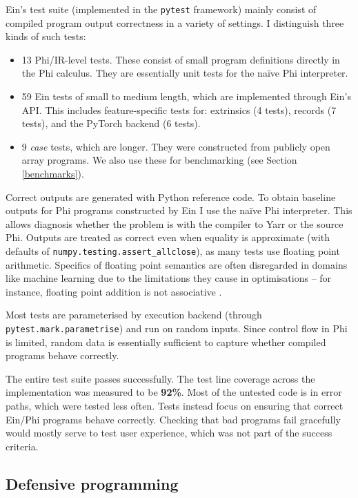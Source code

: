 Ein's test suite (implemented in the \texttt{pytest} framework) mainly consist of compiled program output correctness in a variety of settings. 
I distinguish three kinds of such tests:
\begin{itemize}
    \item 13 Phi/IR-level tests. These consist of small program definitions directly in the Phi calculus. They are essentially unit tests for the na\"ive Phi interpreter.
    \item 59 Ein tests of small to medium length, which are implemented through Ein's API. This includes feature-specific tests for: extrinsics (4 tests), records (7 tests), and the PyTorch backend (6 tests).
    \item 9 \textit{case} tests, which are longer. They were constructed from publicly open array programs. We also use these for benchmarking (see Section \ref{benchmarks}).
\end{itemize}

Correct outputs are generated with Python reference code.
To obtain baseline outputs for Phi programs constructed by Ein I use the na\"ive Phi interpreter.
This allows diagnosis whether the problem is with the compiler to Yarr or the source Phi.
Outputs are treated as correct even when equality is approximate (with defaults of \texttt{numpy.testing.assert\_allclose}), as many tests use floating point arithmetic. 
Specifics of floating point semantics are often disregarded in domains like machine learning due to the limitations they cause in optimisations -- for instance, floating point addition is not associative \cite{alawi2004every}.

Most tests are parameterised by execution backend (through \texttt{pytest.mark.parametrise}) and run on random inputs. Since control flow in Phi is limited, random data is essentially sufficient to capture whether compiled programs behave correctly. 

The entire test suite passes successfully. The test line coverage across the implementation was measured to be \textbf{92\%}. Most of the untested code is in error paths, which were tested less often. Tests instead focus on ensuring that correct Ein/Phi programs behave correctly.
Checking that bad programs fail gracefully would mostly serve to test user experience, which was not part of the success criteria.

\subsection{Defensive programming}

